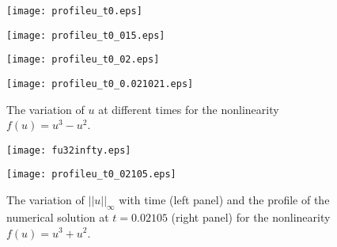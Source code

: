 \documentclass[10pt]{article}
\numberwithin{equation}{section}
\begin{document}
	\begin{figure}[!htbp] 
		\begin{minipage}[t]{0.45\linewidth}
			\centering
			\texttt{[image: profileu\_t0.eps]}
		\end{minipage}%
		\hspace{20pt}
		\begin{minipage}[t]{0.45\linewidth}
			\centering
			\texttt{[image: profileu\_t0\_015.eps]}
		\end{minipage}
		\begin{minipage}[t]{0.45\linewidth}
			\centering
			\texttt{[image: profileu\_t0\_02.eps]}
		\end{minipage}%
		\hspace{40pt}
		\begin{minipage}[t]{0.45\linewidth}
			\centering
			\texttt{[image: profileu\_t0\_0.021021.eps]}
		\end{minipage}
		\caption{ The variation of $u$ at different times for the nonlinearity $f(u)=u^3-u^2$.  }\label{u3ueksi2}
	\end{figure}
	\begin{figure}[!htbp] 
		\begin{minipage}[t]{0.45\linewidth}
			\centering
			\texttt{[image: fu32infty.eps]}
		\end{minipage}%
		\hspace{20pt}
		\begin{minipage}[t]{0.45\linewidth}
			\centering
			\texttt{[image: profileu\_t0\_02105.eps]}
		\end{minipage}
		
		\caption{ The variation of $||u||_\infty$ with time (left panel)  and  the profile of the numerical solution at $t=0.02105$ (right panel)
			for the nonlinearity $f(u)=u^3+u^2$. }\label{u3u2}
	\end{figure}
	
\end{document}
